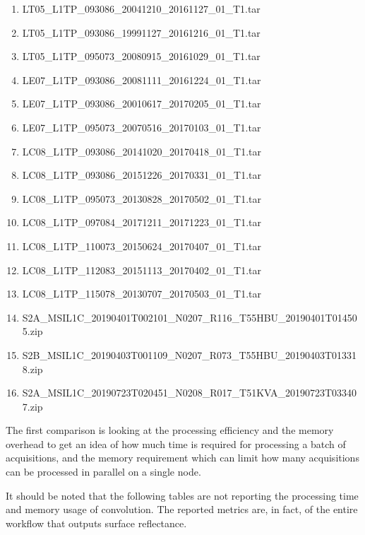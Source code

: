 \documentclass[a4paper]{article}
\begin{document}
      \begin{enumerate}
        \item \footnotesize{LT05\_L1TP\_093086\_20041210\_20161127\_01\_T1.tar}
        \item \footnotesize{LT05\_L1TP\_093086\_19991127\_20161216\_01\_T1.tar}
        \item \footnotesize{LT05\_L1TP\_095073\_20080915\_20161029\_01\_T1.tar}
        \item \footnotesize{LE07\_L1TP\_093086\_20081111\_20161224\_01\_T1.tar}
        \item \footnotesize{LE07\_L1TP\_093086\_20010617\_20170205\_01\_T1.tar}
        \item \footnotesize{LE07\_L1TP\_095073\_20070516\_20170103\_01\_T1.tar}
        \item \footnotesize{LC08\_L1TP\_093086\_20141020\_20170418\_01\_T1.tar}
        \item \footnotesize{LC08\_L1TP\_093086\_20151226\_20170331\_01\_T1.tar}
        \item \footnotesize{LC08\_L1TP\_095073\_20130828\_20170502\_01\_T1.tar}
        \item \footnotesize{LC08\_L1TP\_097084\_20171211\_20171223\_01\_T1.tar}
        \item \footnotesize{LC08\_L1TP\_110073\_20150624\_20170407\_01\_T1.tar}
        \item \footnotesize{LC08\_L1TP\_112083\_20151113\_20170402\_01\_T1.tar}
        \item \footnotesize{LC08\_L1TP\_115078\_20130707\_20170503\_01\_T1.tar}
        \item \footnotesize{S2A\_MSIL1C\_20190401T002101\_N0207\_R116\_T55HBU\_20190401T014505.zip}
        \item \footnotesize{S2B\_MSIL1C\_20190403T001109\_N0207\_R073\_T55HBU\_20190403T013318.zip}
        \item \footnotesize{S2A\_MSIL1C\_20190723T020451\_N0208\_R017\_T51KVA\_20190723T033407.zip}
      \end{enumerate}

    \begin{flushleft}
      The first comparison is looking at the processing efficiency and the memory overhead to get an idea of how much time is required for processing a batch of acquisitions, and the memory requirement which can limit how many acquisitions can be processed in parallel on a single node. \par
      It should be noted that the following tables are not reporting the processing time and memory usage of convolution. The reported metrics are, in fact, of the entire workflow that outputs surface reflectance.
    \end{flushleft}
\end{document}

